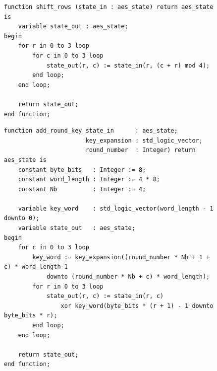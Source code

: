 \begin{figure}[!p]
\begin{lstlisting}[style=vhdl, captionpos=b, caption={Implementacja transformacji stanu ShiftRows}, label={lst:shift-rows}]
function shift_rows (state_in : aes_state) return aes_state is
 	variable state_out : aes_state;
begin
	for r in 0 to 3 loop
		for c in 0 to 3 loop
			state_out(r, c) := state_in(r, (c + r) mod 4);
		end loop;
	end loop;
		
	return state_out;
end function;
\end{lstlisting}
\end{figure}


\begin{figure}[!p]
\begin{lstlisting}[style=vhdl, captionpos=b, caption={Implementacja transformacji stanu AddRoundKey}, label={lst:add-round-key}]
function add_round_key state_in      : aes_state; 
                       key_expansion : std_logic_vector; 
                       round_number  : Integer) return aes_state is
	constant byte_bits   : Integer := 8;
	constant word_length : Integer := 4 * 8;
	constant Nb          : Integer := 4;

	variable key_word    : std_logic_vector(word_length - 1 downto 0);
 	variable state_out   : aes_state;
begin
	for c in 0 to 3 loop
		key_word := key_expansion((round_number * Nb + 1 + c) * word_length-1 
			downto (round_number * Nb + c) * word_length);
		for r in 0 to 3 loop
			state_out(r, c) := state_in(r, c) 
				xor key_word(byte_bits * (r + 1) - 1 downto byte_bits * r);
		end loop;
	end loop;

	return state_out;
end function;
\end{lstlisting}
\end{figure}

